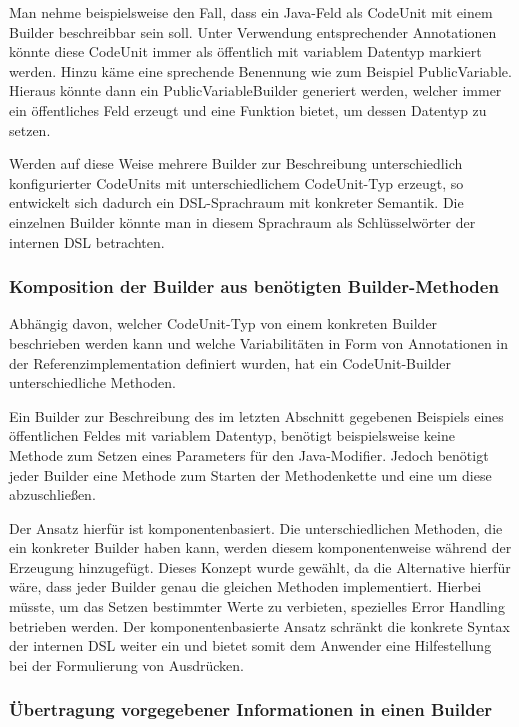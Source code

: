 \documentclass[12pt,oneside,a4paper,parskip]{scrbook}
\begin{document}
Man nehme beispielsweise den Fall, dass ein Java-Feld als CodeUnit mit einem Builder beschreibbar sein soll. Unter Verwendung entsprechender Annotationen könnte diese CodeUnit immer als öffentlich mit variablem Datentyp markiert werden. Hinzu käme eine sprechende Benennung wie zum Beispiel PublicVariable. Hieraus könnte dann ein PublicVariableBuilder generiert werden, welcher immer ein öffentliches Feld erzeugt und eine Funktion bietet, um dessen Datentyp zu setzen.

Werden auf diese Weise mehrere Builder zur Beschreibung unterschiedlich konfigurierter CodeUnits mit unterschiedlichem CodeUnit-Typ erzeugt, so entwickelt sich dadurch ein DSL-Sprachraum mit konkreter Semantik. Die einzelnen Builder könnte man in diesem Sprachraum als Schlüsselwörter der internen DSL betrachten.

\subsubsection{Komposition der Builder aus benötigten Builder-Methoden}

Abhängig davon, welcher CodeUnit-Typ von einem konkreten Builder beschrieben werden kann und welche Variabilitäten in Form von Annotationen in der Referenzimplementation definiert wurden, hat ein CodeUnit-Builder unterschiedliche Methoden.

Ein Builder zur Beschreibung des im letzten Abschnitt gegebenen Beispiels eines öffentlichen Feldes mit variablem Datentyp, benötigt beispielsweise keine Methode zum Setzen eines Parameters für den Java-Modifier. Jedoch benötigt jeder Builder eine Methode zum Starten der Methodenkette und eine um diese abzuschließen.

Der Ansatz hierfür ist  komponentenbasiert. Die unterschiedlichen Methoden, die ein konkreter Builder haben kann, werden diesem komponentenweise während der Erzeugung hinzugefügt. Dieses Konzept wurde gewählt, da die Alternative hierfür wäre, dass jeder Builder genau die gleichen Methoden implementiert. Hierbei müsste, um das Setzen bestimmter Werte zu verbieten, spezielles Error Handling betrieben werden. Der komponentenbasierte Ansatz schränkt die konkrete Syntax der internen DSL weiter ein und bietet somit dem Anwender eine Hilfestellung bei der Formulierung von Ausdrücken.

\subsubsection{Übertragung vorgegebener Informationen in einen Builder}
\end{document}
